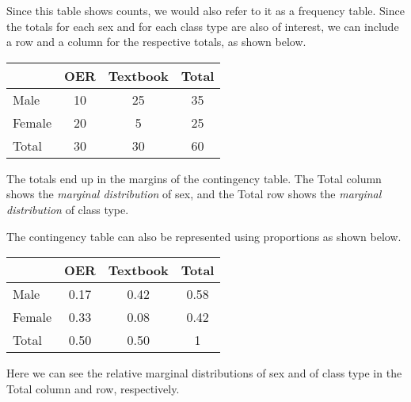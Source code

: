 Since this table shows counts, we would also refer to it as a frequency table.  Since the totals for each sex and for each class type are also of interest, we can include a row and a column for the respective totals, as shown below.

\begin{center}
\begin{tabular}{l|cc|c}
& OER & Textbook & Total \\ \hline
Male & 10 & 25 & 35 \\
Female & 20 & 5 & 25 \\ \hline
Total & 30 & 30 & 60
\end{tabular}
\end{center}

The totals end up in the margins of the contingency table. The Total column shows the \emph{marginal distribution} of sex, and the Total row shows the \emph{marginal distribution} of class type. 

The contingency table can also be represented using proportions as shown below.

\begin{center}
\begin{tabular}{l|cc|c}
& OER & Textbook & Total \\ \hline
Male & 0.17 & 0.42 & 0.58 \\
Female & 0.33 & 0.08 & 0.42 \\ \hline
Total & 0.50 & 0.50 & 1
\end{tabular}
\end{center}

Here we can see the relative marginal distributions of sex and of class type in the Total column and row, respectively.

